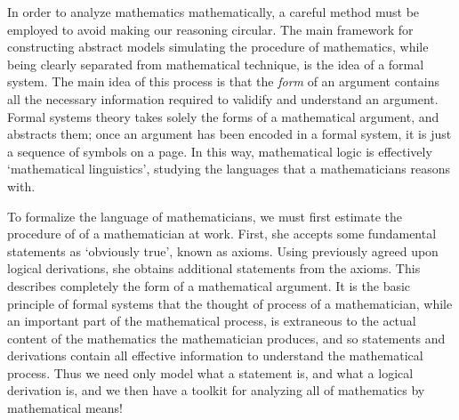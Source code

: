 In order to analyze mathematics mathematically, a careful method must be employed to avoid making our reasoning circular. The main framework for constructing abstract models simulating the procedure of mathematics, while being clearly separated from mathematical technique, is the idea of a formal system. The main idea of this process is that the {\it form} of an argument contains all the necessary information required to validify and understand an argument. Formal systems theory takes solely the forms of a mathematical argument, and abstracts them; once an argument has been encoded in a formal system, it is just a sequence of symbols on a page. In this way, mathematical logic is effectively `mathematical linguistics', studying the languages that a mathematicians reasons with.

To formalize the language of mathematicians, we must first estimate the procedure of of a mathematician at work. First, she accepts some fundamental statements as `obviously true', known as axioms. Using previously agreed upon logical derivations, she obtains additional statements from the axioms. This describes completely the form of a mathematical argument. It is the basic principle of formal systems that the thought of process of a mathematician, while an important part of the mathematical process, is extraneous to the actual content of the mathematics the mathematician produces, and so statements and derivations contain all effective information to understand the mathematical process. Thus we need only model what a statement is, and what a logical derivation is, and we then have a toolkit for analyzing all of mathematics by mathematical means!



